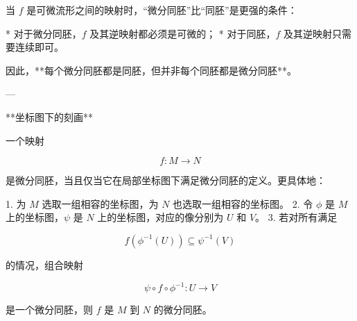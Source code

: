 当 $f$ 是可微流形之间的映射时，“微分同胚”比“同胚”是更强的条件：

* 对于微分同胚，$f$ 及其逆映射都必须是可微的；
* 对于同胚，$f$ 及其逆映射只需要连续即可。

因此，**每个微分同胚都是同胚，但并非每个同胚都是微分同胚**。

---

**坐标图下的刻画**

一个映射

$$
f: M \to N
$$

是微分同胚，当且仅当它在局部坐标图下满足微分同胚的定义。更具体地：

1. 为 $M$ 选取一组相容的坐标图，为 $N$ 也选取一组相容的坐标图。
2. 令 $\phi$ 是 $M$ 上的坐标图，$\psi$ 是 $N$ 上的坐标图，对应的像分别为 $U$ 和 $V$。
3. 若对所有满足

   $$
   f(\phi^{-1}(U)) \subseteq \psi^{-1}(V)
   $$

   的情况，组合映射

   $$
   \psi \circ f \circ \phi^{-1}: U \to V
   $$

   是一个微分同胚，则 $f$ 是 $M$ 到 $N$ 的微分同胚。
